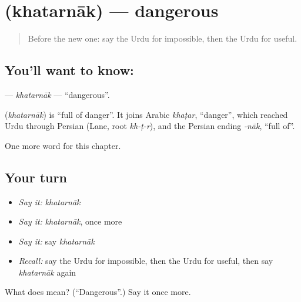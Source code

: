 \section[\texorpdfstring{\ur{خطرناک} (khatarnāk)}{خطرناک (khatarnāk)}]{ (khatarnāk) — dangerous}

\label{lesson:UR-C247-khatarnak}



\begin{quote}
Before the new one: say the Urdu for impossible, then the Urdu for useful.
\end{quote}

\subsection*{You'll want to know: }
\textbf{} — \emph{khatarnāk} — \textquotedblleft{}dangerous\textquotedblright{}.

\begin{cousinweb}
\textbf{} (\emph{khatarnāk}) is \textquotedblleft{}full of danger\textquotedblright{}. It joins Arabic \emph{khaṭar}, \textquotedblleft{}danger\textquotedblright{}, which reached Urdu through Persian (Lane, root \emph{kh-ṭ-r}), and the Persian ending \emph{-nāk}, \textquotedblleft{}full of\textquotedblright{}.
\end{cousinweb}

\begin{grammarlens}[title={What you've built}]
One more word for this chapter.
\end{grammarlens}

\subsection*{Your turn}
\begin{itemize}
\raggedright
  \item \emph{Say it:} \emph{khatarnāk}
  \item \emph{Say it:} \emph{khatarnāk}, once more
  \item \emph{Say it:} say \emph{khatarnāk}
  \item \emph{Recall:} say the Urdu for impossible, then the Urdu for useful, then say \emph{khatarnāk} again
\end{itemize}

\begin{tcolorbox}[breakable,colback=teal!4,colframe=teal!35!black,title={Before you move on}]
What does  mean? (\textquotedblleft{}Dangerous\textquotedblright{}.) Say it once more.
\end{tcolorbox}
